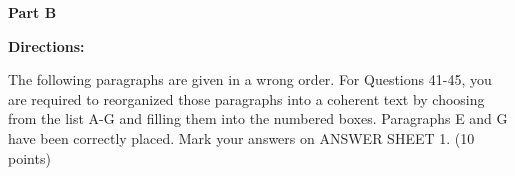 
\textbf{Part B}

\textbf{Directions:}

The following paragraphs are given in a wrong order. For Questions 41-45, you are required to reorganized those paragraphs into a coherent text by choosing from the list A-G and filling them into the numbered boxes. Paragraphs E and G have been correctly placed.  Mark your answers on ANSWER SHEET 1. (10 points)

\vspace{6pt}